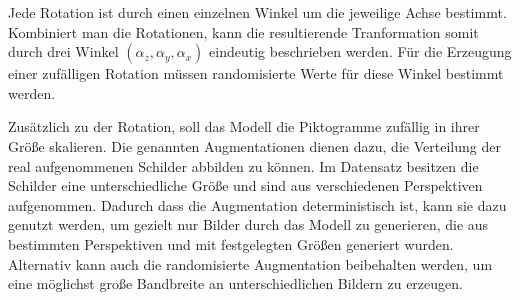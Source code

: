 
Jede Rotation ist durch einen einzelnen Winkel um die jeweilige Achse bestimmt. Kombiniert man die Rotationen, kann die resultierende Tranformation somit durch drei Winkel $(\alpha_z, \alpha_y, \alpha_x)$ eindeutig beschrieben werden. Für die Erzeugung einer zufälligen Rotation müssen randomisierte Werte für diese Winkel bestimmt werden. \cite{math-primer}

Zusätzlich zu der Rotation, soll das Modell die Piktogramme zufällig in ihrer Größe skalieren. Die genannten Augmentationen dienen dazu, die Verteilung der real aufgenommenen Schilder abbilden zu können. Im Datensatz besitzen die Schilder eine unterschiedliche Größe und sind aus verschiedenen Perspektiven aufgenommen. Dadurch dass die Augmentation deterministisch ist, kann sie dazu genutzt werden, um gezielt nur Bilder durch das Modell zu generieren, die aus bestimmten Perspektiven und mit festgelegten Größen generiert wurden. Alternativ kann auch die randomisierte Augmentation beibehalten werden, um eine möglichst große Bandbreite an unterschiedlichen Bildern zu erzeugen.


